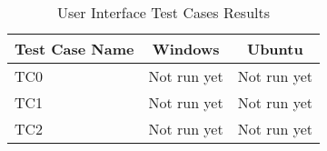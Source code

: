 \begin{table}[!ht]
\begin{center}
\begin{tabular}{|l|c|c|}
	\hline
	{ \bf Test Case Name } & { \bf Windows } & { \bf Ubuntu } \\
	\hline \hline
	TC0      & Not run yet & Not run yet  \\
	TC1      & Not run yet & Not run yet  \\
   TC2      & Not run yet & Not run yet  \\
	\hline
\end{tabular}
\caption{User Interface Test Cases Results}
\label{tab:UITCResults}
\end{center}
\end{table}
